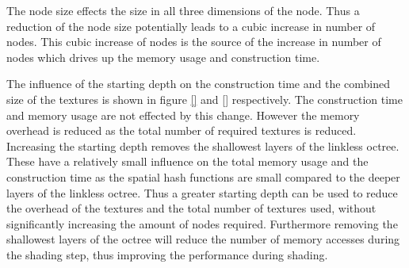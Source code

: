 The node size effects the size in all three dimensions of the node. Thus a reduction of the
node size potentially leads to a cubic increase in number of nodes. This cubic increase
of nodes is the source of the increase in number of nodes which drives up the memory usage
and construction time.

The influence of the starting depth on the construction time and the combined size of the textures
is shown in figure \ref{} and \ref{} respectively. The construction time and memory usage
are not effected by this change. However the memory overhead is reduced as
the total number of required textures is reduced. Increasing the starting depth
removes the shallowest layers of the linkless octree. These have a relatively small
influence on the total memory usage and the construction time as the spatial hash functions
are small compared to the deeper layers of the linkless octree. Thus a greater starting depth
can be used to reduce the overhead of the textures and the total number of textures used,
without significantly increasing the amount of nodes required. Furthermore
removing the shallowest layers of the octree will reduce the number of memory accesses
during the shading step, thus improving the performance during shading.




